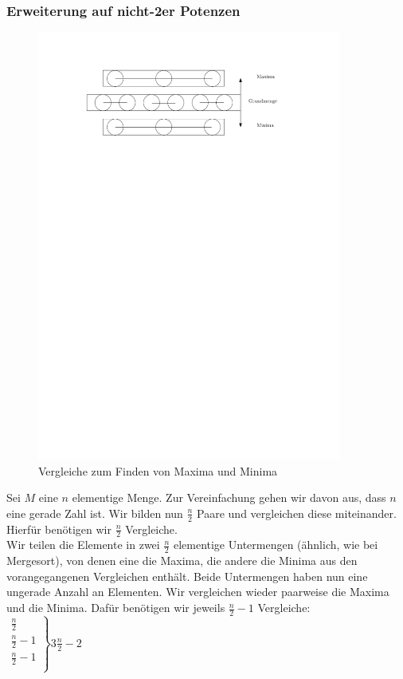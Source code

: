 \subsubsection*{Erweiterung auf nicht-2er Potenzen}
\begin{figure}[h]
    \begin{center}
        \includegraphics[width=10cm ]{../GFX/vl4_fig_comp.pdf}
        \caption{Vergleiche zum Finden von Maxima und Minima}
    \end{center}
\end{figure}
Sei $M$ eine $n$ elementige Menge. Zur Vereinfachung gehen wir davon aus, dass $n$ eine gerade Zahl ist. Wir bilden nun $\frac{n}{2}$ Paare und vergleichen diese miteinander. Hierfür benötigen wir $\frac{n}{2}$ Vergleiche.\\
Wir teilen die Elemente in zwei $\frac{n}{2}$ elementige Untermengen (ähnlich, wie bei Mergesort), von denen eine die Maxima, die andere die Minima aus den vorangegangenen Vergleichen enthält. Beide Untermengen haben nun eine ungerade Anzahl an Elementen. Wir vergleichen wieder paarweise die Maxima und die Minima. Dafür benötigen wir jeweils $\frac{n}{2}-1$ Vergleiche:\\
$\left.\begin{array}{l}
\frac{n}{2}\\
\frac{n}{2}-1\\
\frac{n}{2}-1\\
\end{array}\right\rbrace 3\frac{n}{2}-2$

